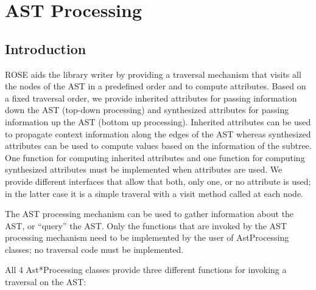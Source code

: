 
\chapter{AST Processing}
\label{AstProcessing:astProcessing}


\section{Introduction}
\label{AstProcessing:introduction}

ROSE aids the library writer by providing a traversal
mechanism that visits all the nodes of the AST in a predefined order
and to compute attributes.  Based on a fixed traversal order, we
provide inherited attributes for passing information down the AST (top-down processing) and synthesized attributes for passing information up
the AST (bottom up processing). Inherited attributes can be used to
propagate context information along the edges of the AST whereas
synthesized attributes can be used to compute values based on the
information of the subtree.  One function for computing inherited
attributes and one function for computing synthesized attributes must
be implemented when attributes are used.  We provide different
interfaces that allow that both, only one, or no attribute is used; in
the latter case it is a simple traveral with a visit method called at
each node.

The AST processing mechanism can be used to gather information
about the AST, or ``query'' the AST. Only the functions that are
invoked by the AST processing mechanism need to be implemented by the user
of AstProcessing classes; no traversal code must be implemented.

All 4 Ast*Processing classes provide three different functions for invoking a traversal on the AST:

